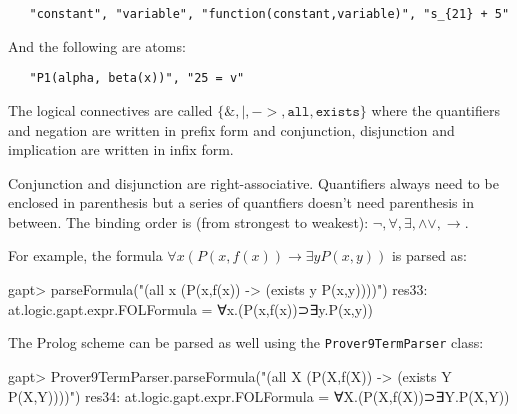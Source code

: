 \documentclass[a4paper,11pt]{article}
\renewcommand{\land}{\wedge}
\renewcommand{\lor}{\vee}
\begin{document}
\begin{appendix}
 \begin{lstlisting}
   "constant", "variable", "function(constant,variable)", "s_{21} + 5"
 \end{lstlisting}

And the following are atoms:

 \begin{lstlisting}
   "P1(alpha, beta(x))", "25 = v"
 \end{lstlisting}

The logical connectives are called $\{\mathtt{\&,|,->,all,exists}\}$ where
 the quantifiers and negation are written in prefix form and conjunction,
 disjunction and implication are written in infix form.

Conjunction and disjunction are right-associative. Quantifiers always need to
 be enclosed in parenthesis but a series of quantfiers doesn't need parenthesis
 in between. The binding order is (from strongest to weakest):
 $\mathtt{\neg,\forall,\exists,\land\lor,\rightarrow}$.


For example, the formula $\forall x (P(x,f(x)) \rightarrow \exists y P(x,y))$
 is parsed as:

\begin{clilisting}
gapt> parseFormula("(all x (P(x,f(x)) -> (exists y P(x,y))))")
res33: at.logic.gapt.expr.FOLFormula = ∀x.(P(x,f(x))⊃∃y.P(x,y))

\end{clilisting}

The Prolog scheme can be parsed as well using the \texttt{Prover9TermParser}
class:

\begin{clilisting}
gapt> Prover9TermParser.parseFormula("(all X (P(X,f(X)) -> (exists Y P(X,Y))))")
res34: at.logic.gapt.expr.FOLFormula = ∀X.(P(X,f(X))⊃∃Y.P(X,Y))

\end{clilisting}




\end{appendix}

\vfill
\pagebreak



\end{document}
